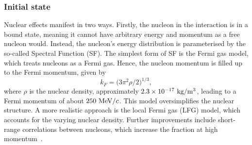 \subsubsection{Initial state}
Nuclear effects manifest in two ways.
Firstly, the nucleon in the interaction is in a bound state, meaning it cannot have arbitrary energy and momentum as a free nucleon would.
Instead, the nucleon’s energy distribution is parameterised by the so-called Spectral Function (SF).
The simplest form of SF is the Fermi gas model, which treats nucleons as a Fermi gas.
Hence, the nucleon momentum is filled up to the Fermi momentum, given by
\begin{equation}
    k_F = \bigl(3\pi^2 \rho/2\bigr)^{1/3},
\end{equation}
where $\rho$ is the nuclear density, approximately $2.3\times 10^{-17}~\textrm{kg}/\textrm{m}^3$, leading to a Fermi momentum of about $250~\textrm{MeV}/c$.
This model oversimplifies the nuclear structure.
A more realistic approach is the local Fermi gas (LFG) model, which accounts for the varying nuclear density.
Further improvements include short-range correlations between nucleons, which increase the fraction at high momentum~\cite{Benhar:1994hw}.

